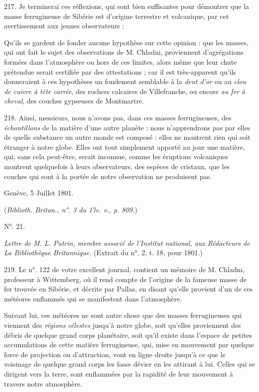 \documentclass[a4paper, 11pt, oneside, polutonikogreek, french]{article}
\begin{document}
217. Je terminerai ces réflexions, qui sont bien suffisantes pour démontrer que la masse ferrugineuse de Sibérie est d'origine terrestre et volcanique, par cet avertissement aux jeunes observateurs :

\og Qu'ils se gardent de fonder aucune hypothèse sur cette opinion : que les masses, qui ont fait le sujet des observations de M. Chladni, proviennent d'agrégations formées dans l'atmosphère ou hors de ces limites, alors même que leur chute prétendue serait certifiée par des attestations ; car il est très-apparent qu'ils donneraient à ces hypothèses un fondement semblable à la \emph{dent d'or} ou au \emph{clou de cuivre à tête carrée}, des rochers calcaires de Villefranche, ou encore \emph{au fer à cheval}, des couches gypseuses de Montmartre. \fg

218. Ainsi, messieurs, nous n'avons pas, dans ces masses ferrugineuses, des \emph{échantillons} de la matière d'une autre planète ; nous n'apprendrons pas par elles de quelle substance un autre monde est composé : elles ne montrent rien qui soit étranger à notre globe. Elles ont tout simplement apporté au jour une matière, qui, sans cela peut-être, serait inconnue, comme les éruptions volcaniques montrent quelquefois à leurs observateurs, des espèces de cristaux, que les couches qui sont à la portée de notre observation ne produisent pas.

Genève, 5 Juillet 1801.

(\emph{Biblioth. Britan., n°. 3 du 17e. v., p. 809.})
 
\begin{center}
N°. 21.
\end{center}

\emph{Lettre de M. L. Patrin, membre associé de l'Institut national, aux Rédacteurs de La Bibliothèque Britannique.} (Extrait du n°. 2, t. 18, pour 1801.)

219. \og Le n°. 122 de votre excellent journal, contient un mémoire de M. Chladni, professeur à Wittemberg, où il rend compte de l'origine de la fameuse masse de fer trouvée en Sibérie, et décrite par Pallas, en disant qu'elle provient d'un de ces météores enflammés qui se manifestent dans l'atmosphère. \fg

Suivant lui, ces météores ne sont autre chose que des masses ferrugineuses qui viennent des \emph{régions célestes} jusqu'à notre globe, soit qu'elles proviennent des débris de quelque grand corps planétaire, soit qu'il existe dans l'espace de petites accumulations de cette matière ferrugineuse, qui, mise en mouvement par quelque force de projection ou d'attraction, vont en ligne droite jusqu'à ce que le voisinage de quelque grand corps les fasse dévier en les attirant à lui. Celles qui se dirigent vers la terre, sont enflammées par la rapidité de leur mouvement à travers notre atmosphère.
\end{document}
